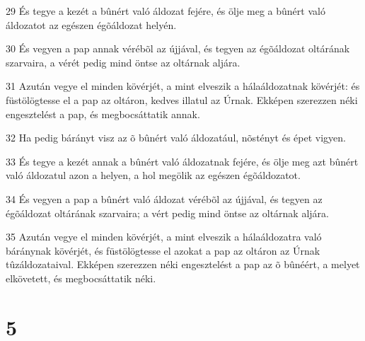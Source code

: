 \par 29 És tegye a kezét a bûnért való áldozat fejére, és ölje meg a bûnért való áldozatot az egészen égõáldozat helyén.
\par 30 És vegyen a pap annak vérébõl az újjával, és tegyen az égõáldozat oltárának szarvaira, a vérét pedig mind öntse az oltárnak aljára.
\par 31 Azután vegye el minden kövérjét, a mint elveszik a hálaáldozatnak kövérjét: és füstölögtesse el a pap az oltáron, kedves illatul az Úrnak. Ekképen szerezzen néki engesztelést a pap, és megbocsáttatik annak.
\par 32 Ha pedig bárányt visz az õ bûnért való áldozatául, nõstényt és épet vigyen.
\par 33 És tegye a kezét annak a bûnért való áldozatnak fejére, és ölje meg azt bûnért való áldozatul azon a helyen, a hol megölik az egészen égõáldozatot.
\par 34 És vegyen a pap a bûnért való áldozat vérébõl az újjával, és tegyen az égõáldozat oltárának szarvaira; a vért pedig mind öntse az oltárnak aljára.
\par 35 Azután vegye el minden kövérjét, a mint elveszik a hálaáldozatra való báránynak kövérjét, és füstölögtesse el azokat a pap az oltáron az Úrnak tûzáldozataival. Ekképen szerezzen néki engesztelést a pap az õ bûnéért, a melyet elkövetett, és megbocsáttatik néki.

\chapter{5}

